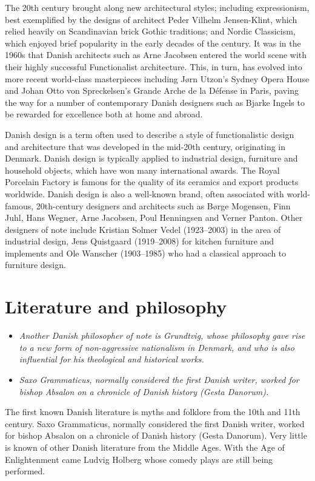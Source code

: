 The 20th century brought along new architectural styles; including
expressionism, best exemplified by the designs of architect Peder
Vilhelm Jensen-Klint, which relied heavily on Scandinavian brick Gothic
traditions; and Nordic Classicism, which enjoyed brief popularity in the
early decades of the century. It was in the 1960s that Danish architects
such as Arne Jacobsen entered the world scene with their highly
successful Functionalist architecture. This, in turn, has evolved into
more recent world-class masterpieces including Jørn Utzon's Sydney Opera
House and Johan Otto von Spreckelsen's Grande Arche de la Défense in
Paris, paving the way for a number of contemporary Danish designers such
as Bjarke Ingels to be rewarded for excellence both at home and abroad.

Danish design is a term often used to describe a style of
functionalistic design and architecture that was developed in the
mid-20th century, originating in Denmark. Danish design is typically
applied to industrial design, furniture and household objects, which
have won many international awards. The Royal Porcelain Factory is
famous for the quality of its ceramics and export products worldwide.
Danish design is also a well-known brand, often associated with
world-famous, 20th-century designers and architects such as Børge
Mogensen, Finn Juhl, Hans Wegner, Arne Jacobsen, Poul Henningsen and
Verner Panton. Other designers of note include Kristian Solmer Vedel
(1923--2003) in the area of industrial design, Jens Quistgaard
(1919--2008) for kitchen furniture and implements and Ole Wanscher
(1903--1985) who had a classical approach to furniture design.

\section{Literature and philosophy}\label{literature-and-philosophy}

\begin{itemize}
\item
  \emph{Another Danish philosopher of note is Grundtvig, whose
  philosophy gave rise to a new form of non-aggressive nationalism in
  Denmark, and who is also influential for his theological and
  historical works.}
\item
  \emph{Saxo Grammaticus, normally considered the first Danish writer,
  worked for bishop Absalon on a chronicle of Danish history (Gesta
  Danorum).}
\end{itemize}

The first known Danish literature is myths and folklore from the 10th
and 11th century. Saxo Grammaticus, normally considered the first Danish
writer, worked for bishop Absalon on a chronicle of Danish history
(Gesta Danorum). Very little is known of other Danish literature from
the Middle Ages. With the Age of Enlightenment came Ludvig Holberg whose
comedy plays are still being performed.

